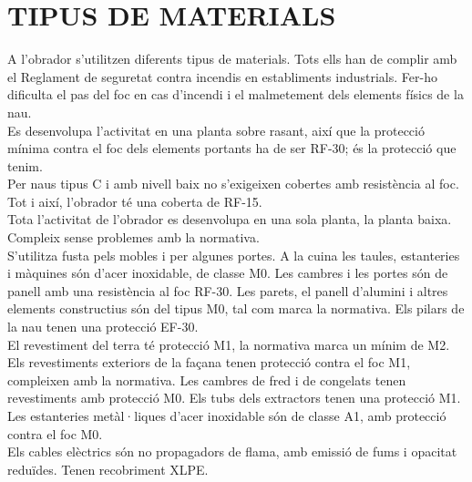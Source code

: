 \section{\uppercase{Tipus de materials}}
A l'obrador s'utilitzen diferents tipus de materials. Tots ells han de complir amb el Reglament de seguretat contra incendis en establiments industrials. Fer-ho dificulta el pas del foc en cas d'incendi i el malmetement dels elements físics de la nau.\\
\newline Es desenvolupa l'activitat en una planta sobre rasant, així que la protecció mínima contra el foc dels elements portants ha de ser RF-30; és la protecció que tenim.\\
\newline Per naus tipus C i amb nivell baix no s'exigeixen cobertes amb resistència al foc. Tot i així, l'obrador té una coberta de RF-15.\\
\newline Tota l'activitat de l'obrador es desenvolupa en una sola planta, la planta baixa. Compleix sense problemes amb la normativa.\\
\newline S'utilitza fusta pels mobles i per algunes portes. A la cuina les taules, estanteries i màquines són d'acer inoxidable, de classe M0. Les cambres i les portes són de panell amb una resistència al foc RF-30. Les parets, el panell d'alumini i altres elements constructius són del tipus M0, tal com marca la normativa. Els pilars de la nau tenen una protecció EF-30.\\
\newline El revestiment del terra té protecció M1, la normativa marca un mínim de M2.  Els revestiments exteriors de la façana tenen protecció contra el foc M1, compleixen amb la normativa. Les cambres de fred i de congelats tenen revestiments amb protecció M0. Els tubs dels extractors tenen una protecció M1.\\
\newline Les estanteries metàl·liques d'acer inoxidable són de classe A1, amb protecció contra el foc M0.\\
\newline Els cables elèctrics són no propagadors de flama, amb emissió de fums i opacitat reduïdes. Tenen recobriment XLPE.\\


